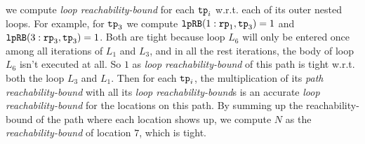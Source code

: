 we compute \emph{loop reachability-bound} for each $\mathtt{tp}_i$ w.r.t. each of its outer nested loops.
For example, for $\mathtt{tp}_3$ we compute
$\mathtt{lpRB}(1: \mathtt{rp}_1, \mathtt{tp}_3) = 1$ and
$\mathtt{lpRB}(3: \mathtt{rp}_3, \mathtt{tp}_3) = 1$.
Both are tight because loop $L_6$ will only be entered once among all iterations of $L_1$ and $L_3$, and in all the rest iterations, the body of loop $L_6$ isn't executed at all.
So $1$ as \emph{loop reachability-bound} of this path is tight w.r.t. both the loop $L_3$ and $L_1$.
Then for each $\mathtt{tp}_i$, the multiplication of its \emph{path reachability-bound} with all its \emph{loop reachability-bound}s is an accurate \emph{loop reachability-bound} for the locations on this path.
By summing up the reachability-bound of the path where each location shows up,
we compute $N$ as the \emph{reachability-bound} of location $7$, which is tight.

